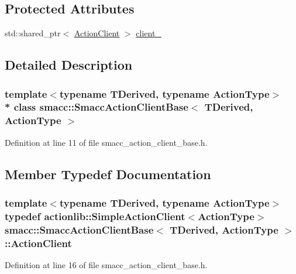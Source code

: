 \subsection*{Protected Attributes}
\begin{DoxyCompactItemize}
\item 
std\+::shared\+\_\+ptr$<$ \hyperlink{classsmacc_1_1SmaccActionClientBase_a87770be9a701846564593ce36d79cfa2}{Action\+Client} $>$ \hyperlink{classsmacc_1_1SmaccActionClientBase_a5ec5c74015ea4e8b61d017f666a4ce17}{client\+\_\+}
\end{DoxyCompactItemize}


\subsection{Detailed Description}
\subsubsection*{template$<$typename T\+Derived, typename Action\+Type$>$\\*
class smacc\+::\+Smacc\+Action\+Client\+Base$<$ T\+Derived, Action\+Type $>$}



Definition at line 11 of file smacc\+\_\+action\+\_\+client\+\_\+base.\+h.



\subsection{Member Typedef Documentation}
\subsubsection[{\texorpdfstring{Action\+Client}{ActionClient}}]{\setlength{\rightskip}{0pt plus 5cm}template$<$typename T\+Derived, typename Action\+Type$>$ typedef actionlib\+::\+Simple\+Action\+Client$<$Action\+Type$>$ {\bf smacc\+::\+Smacc\+Action\+Client\+Base}$<$ T\+Derived, Action\+Type $>$\+::{\bf Action\+Client}}\hypertarget{classsmacc_1_1SmaccActionClientBase_a87770be9a701846564593ce36d79cfa2}{}\label{classsmacc_1_1SmaccActionClientBase_a87770be9a701846564593ce36d79cfa2}


Definition at line 16 of file smacc\+\_\+action\+\_\+client\+\_\+base.\+h.

